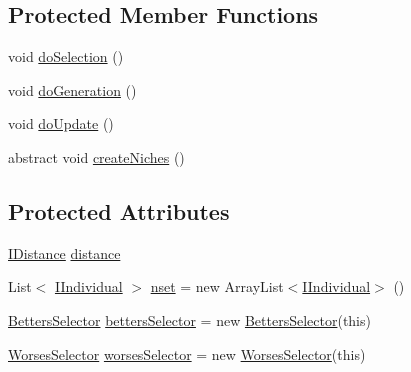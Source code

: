 \subsection*{Protected Member Functions}
\begin{DoxyCompactItemize}
\item 
void \hyperlink{classnet_1_1sf_1_1jclec_1_1algorithm_1_1niching_1_1_spatial_niching_a5927333a9cdba67574e1150cf70b0c1a}{do\-Selection} ()
\item 
void \hyperlink{classnet_1_1sf_1_1jclec_1_1algorithm_1_1niching_1_1_spatial_niching_a77de8a18d13e6fa5740d5a71051714d3}{do\-Generation} ()
\item 
void \hyperlink{classnet_1_1sf_1_1jclec_1_1algorithm_1_1niching_1_1_spatial_niching_ad132cebe539046be40875767a5b9569f}{do\-Update} ()
\item 
abstract void \hyperlink{classnet_1_1sf_1_1jclec_1_1algorithm_1_1niching_1_1_spatial_niching_aa0d6ea4c17a680c3beab861e17232af1}{create\-Niches} ()
\end{DoxyCompactItemize}
\subsection*{Protected Attributes}
\begin{DoxyCompactItemize}
\item 
\hyperlink{interfacenet_1_1sf_1_1jclec_1_1_i_distance}{I\-Distance} \hyperlink{classnet_1_1sf_1_1jclec_1_1algorithm_1_1niching_1_1_spatial_niching_a53db55aa230eb736bb37523c75dae0d8}{distance}
\item 
List$<$ \hyperlink{interfacenet_1_1sf_1_1jclec_1_1_i_individual}{I\-Individual} $>$ \hyperlink{classnet_1_1sf_1_1jclec_1_1algorithm_1_1niching_1_1_spatial_niching_aaf5339850d7394348a6312c6ef7e4a4d}{nset} = new Array\-List$<$\hyperlink{interfacenet_1_1sf_1_1jclec_1_1_i_individual}{I\-Individual}$>$ ()
\item 
\hyperlink{classnet_1_1sf_1_1jclec_1_1selector_1_1_betters_selector}{Betters\-Selector} \hyperlink{classnet_1_1sf_1_1jclec_1_1algorithm_1_1niching_1_1_spatial_niching_ae6a29d4d4e00e575da303152f7ad93c8}{betters\-Selector} = new \hyperlink{classnet_1_1sf_1_1jclec_1_1selector_1_1_betters_selector}{Betters\-Selector}(this)
\item 
\hyperlink{classnet_1_1sf_1_1jclec_1_1selector_1_1_worses_selector}{Worses\-Selector} \hyperlink{classnet_1_1sf_1_1jclec_1_1algorithm_1_1niching_1_1_spatial_niching_acf1e81e044b6cf631ac0741cbc033953}{worses\-Selector} = new \hyperlink{classnet_1_1sf_1_1jclec_1_1selector_1_1_worses_selector}{Worses\-Selector}(this)
\end{DoxyCompactItemize}


